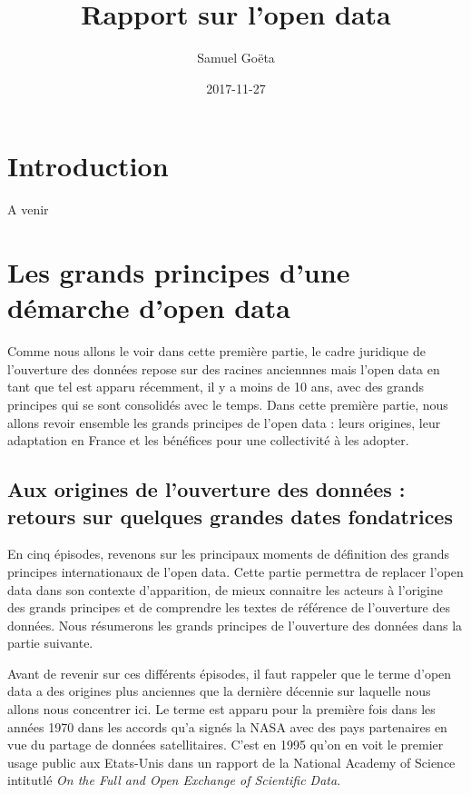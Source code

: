 \documentclass[]{book}
\title{Rapport sur l'open data}
\author{Samuel Goëta}
\date{2017-11-27}
\theoremstyle{definition}
\theoremstyle{definition}
\theoremstyle{definition}
\theoremstyle{remark}
\begin{document}
\maketitle

{
\setcounter{tocdepth}{1}
\tableofcontents
}
\chapter*{Introduction}\label{introduction}

A venir

\chapter{Les grands principes d'une démarche d'open
data}\label{les-grands-principes-dune-demarche-dopen-data}

Comme nous allons le voir dans cette première partie, le cadre juridique
de l'ouverture des données repose sur des racines anciennnes mais l'open
data en tant que tel est apparu récemment, il y a moins de 10 ans, avec
des grands principes qui se sont consolidés avec le temps. Dans cette
première partie, nous allons revoir ensemble les grands principes de
l'open data : leurs origines, leur adaptation en France et les bénéfices
pour une collectivité à les adopter.

\section{Aux origines de l'ouverture des données : retours sur quelques
grandes dates
fondatrices}\label{aux-origines-de-louverture-des-donnees-retours-sur-quelques-grandes-dates-fondatrices}

En cinq épisodes, revenons sur les principaux moments de définition des
grands principes internationaux de l'open data. Cette partie permettra
de replacer l'open data dans son contexte d'apparition, de mieux
connaitre les acteurs à l'origine des grands principes et de comprendre
les textes de référence de l'ouverture des données. Nous résumerons les
grands principes de l'ouverture des données dans la partie suivante.

Avant de revenir sur ces différents épisodes, il faut rappeler que le
terme d'open data a des origines plus anciennes que la dernière décennie
sur laquelle nous allons nous concentrer ici. Le terme est apparu pour
la première fois dans les années 1970 dans les accords qu'a signés la
NASA avec des pays partenaires en vue du partage de données
satellitaires. C'est en 1995 qu'on en voit le premier usage public aux
Etats-Unis dans un rapport de la National Academy of Science intitutlé
\emph{On the Full and Open Exchange of Scientific Data}.
\end{document}
